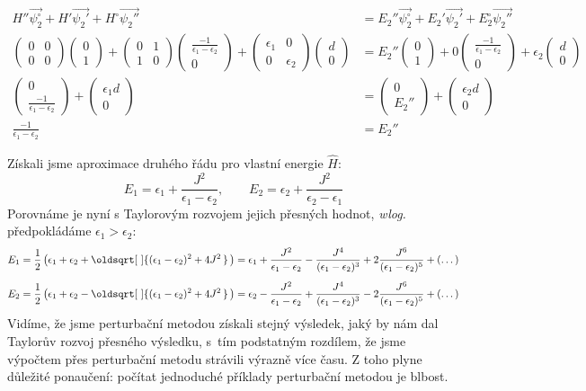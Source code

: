 \documentclass[10pt,a4paper]{article}
\renewcommand*{\sqrt}[2][\ ]{\oldsqrt[#1]{#2\,}\,}
\newcommand{\mat}[1]{
    \begin{pmatrix}
        #1
    \end{pmatrix}
}
\begin{document}
\begin{align*}
    H'' \vec{\psi_2^{\circ}} + H' \vec{\psi_2'} + H^{\circ} \vec{\psi_2''} &= E_2'' \vec{\psi_2^{\circ}} + E_2' \vec{\psi_2'} + E^{\circ}_2 \vec{\psi_2''}
    \\[5pt]
    \mat{0&0\\0&0} \mat{0\\1} +
    \mat{0&1\\1&0} \mat{\frac{-1}{\epsilon_1 - \epsilon_2} \\ 0} +
    \mat{\epsilon_1&0\\0&\epsilon_2} \mat{d\\0}
    &=
    E_2'' \mat{0\\1} +
    0 \mat{\frac{-1}{\epsilon_1 - \epsilon_2} \\ 0}+
    \epsilon_2 \mat{d\\0}
    \\[5pt]
    \mat{0 \\ \frac{-1}{\epsilon_1 - \epsilon_2}} +
    \mat{\epsilon_1 d\\0}
    &=
    \mat{0 \\ E_2''} +
    \mat{\epsilon_2 d\\0}
    \\[5pt]
    \frac{-1}{\epsilon_1 - \epsilon_2} &= E_2''
\end{align*}

\bigskip

Získali jsme aproximace druhého řádu pro vlastní energie $\hat{H}$:
\begin{equation*}
    E_1 = \epsilon_1 + \frac{J^2}{\epsilon_1 - \epsilon_2},
    \hspace{2em}
    E_2 = \epsilon_2 + \frac{J^2}{\epsilon_2 - \epsilon_1}
\end{equation*}
Porovnáme je nyní s Taylorovým rozvojem jejich přesných hodnot, \textit{wlog.} předpokládáme $\epsilon_1 > \epsilon_2$:
\begin{align*}
E_1 &= \frac{1}{2} \left(
    \epsilon_1 + \epsilon_2
    + \sqrt{(\epsilon_1 - \epsilon_2)^2 + 4J^2}
\right)
=
\epsilon_1
+ \frac{J^2}{\epsilon_1 - \epsilon_2}
- \frac{J^4}{(\epsilon_1 - \epsilon_2)^3}
+ 2\frac{J^6}{(\epsilon_1 - \epsilon_2)^5}
+ (\dots)
\\[5pt]
E_2 &= \frac{1}{2} \left(
    \epsilon_1 + \epsilon_2
    - \sqrt{(\epsilon_1 - \epsilon_2)^2 + 4J^2}
\right)
=
\epsilon_2
- \frac{J^2}{\epsilon_1 - \epsilon_2}
+ \frac{J^4}{(\epsilon_1 - \epsilon_2)^3}
- 2\frac{J^6}{(\epsilon_1 - \epsilon_2)^5}
+ (\dots)
\end{align*}
Vidíme, že jsme perturbační metodou získali stejný výsledek, jaký by nám dal Taylorův rozvoj přesného výsledku, s~tím podstatným rozdílem, že jsme výpočtem přes perturbační metodu strávili výrazně více času. Z toho plyne důležité ponaučení: počítat jednoduché příklady perturbační metodou je blbost.
\end{document}
